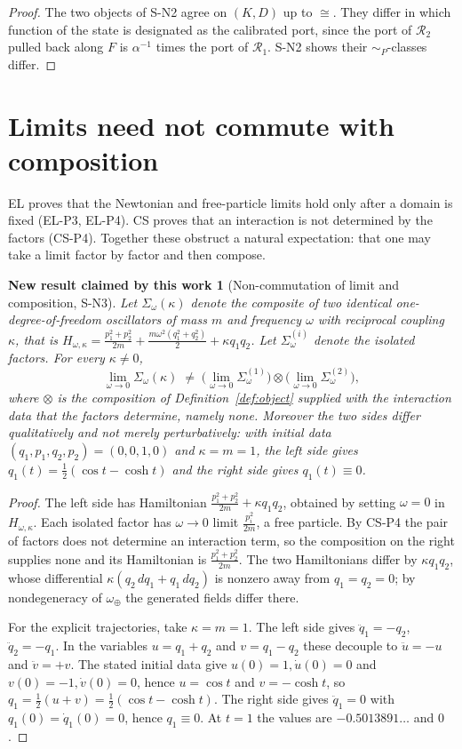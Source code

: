 \documentclass[11pt]{article}
\theoremstyle{plain}
\newtheorem{newresult}[definition]{New result claimed by this work}
\begin{document}
\begin{proof}
The two objects of S-N2 agree on $(K,D)$ up to $\cong$. They differ in which
function of the state is designated as the calibrated port, since the port of
$\mathcal{R}_2$ pulled back along $F$ is $\alpha^{-1}$ times the port of
$\mathcal{R}_1$. S-N2 shows their $\sim_P$-classes differ.
\end{proof}

\section{Limits need not commute with composition}
\label{sec:limits}

EL proves that the Newtonian and free-particle limits hold only after a domain
is fixed (EL-P3, EL-P4). CS proves that an interaction is not determined by the
factors (CS-P4). Together these obstruct a natural expectation: that one may
take a limit factor by factor and then compose.

\begin{newresult}[Non-commutation of limit and composition, S-N3]
\label{res:limits}
Let $\Sigma_\omega(\kappa)$ denote the composite of two identical
one-degree-of-freedom oscillators of mass $m$ and frequency $\omega$ with
reciprocal coupling $\kappa$, that is
$H_{\omega,\kappa}=\frac{p_1^2+p_2^2}{2m}
+\frac{m\omega^2(q_1^2+q_2^2)}{2}+\kappa q_1q_2$. Let
$\Sigma^{(i)}_\omega$ denote the isolated factors. For every $\kappa\neq0$,
\[
 \lim_{\omega\to0}\Sigma_\omega(\kappa)\;\neq\;
 \Big(\lim_{\omega\to0}\Sigma^{(1)}_\omega\Big)\otimes
 \Big(\lim_{\omega\to0}\Sigma^{(2)}_\omega\Big),
\]
where $\otimes$ is the composition of Definition~\ref{def:object} supplied with
the interaction data that the factors determine, namely none. Moreover the two
sides differ qualitatively and not merely perturbatively: with initial data
$(q_1,p_1,q_2,p_2)=(0,0,1,0)$ and $\kappa=m=1$, the left side gives
$q_1(t)=\tfrac12(\cos t-\cosh t)$ and the right side gives $q_1(t)\equiv0$.
\end{newresult}

\begin{proof}
The left side has Hamiltonian $\frac{p_1^2+p_2^2}{2m}+\kappa q_1q_2$, obtained
by setting $\omega=0$ in $H_{\omega,\kappa}$. Each isolated factor has
$\omega\to0$ limit $\frac{p_i^2}{2m}$, a free particle. By CS-P4 the pair of
factors does not determine an interaction term, so the composition on the right
supplies none and its Hamiltonian is $\frac{p_1^2+p_2^2}{2m}$. The two
Hamiltonians differ by $\kappa q_1q_2$, whose differential
$\kappa(q_2\,dq_1+q_1\,dq_2)$ is nonzero away from $q_1=q_2=0$; by nondegeneracy
of $\omega_\oplus$ the generated fields differ there.

For the explicit trajectories, take $\kappa=m=1$. The left side gives
$\ddot q_1=-q_2$, $\ddot q_2=-q_1$. In the variables $u=q_1+q_2$ and
$v=q_1-q_2$ these decouple to $\ddot u=-u$ and $\ddot v=+v$. The stated initial
data give $u(0)=1,\dot u(0)=0$ and $v(0)=-1,\dot v(0)=0$, hence $u=\cos t$ and
$v=-\cosh t$, so $q_1=\tfrac12(u+v)=\tfrac12(\cos t-\cosh t)$. The right side
gives $\ddot q_1=0$ with $q_1(0)=\dot q_1(0)=0$, hence $q_1\equiv0$. At $t=1$
the values are $-0.5013891\ldots$ and $0$.
\end{proof}
\end{document}
